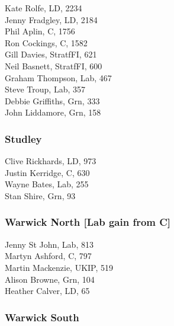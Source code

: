 \documentclass[a4paper,openany,10pt]{book}
\begin{document}


Kate Rolfe, LD, 2234\\
Jenny Fradgley, LD, 2184\\
Phil Aplin, C, 1756\\
Ron Cockings, C, 1582\\
Gill Davies, StratfFI, 621\\
Neil Basnett, StratfFI, 600\\
Graham Thompson, Lab, 467\\
Steve Troup, Lab, 357\\
Debbie Griffiths, Grn, 333\\
John Liddamore, Grn, 158\\


\subsubsection*{Studley}



Clive Rickhards, LD, 973\\
Justin Kerridge, C, 630\\
Wayne Bates, Lab, 255\\
Stan Shire, Grn, 93\\


\subsubsection*{Warwick North \hspace*{\fill}\nolinebreak[1]%
\enspace\hspace*{\fill}
[Lab gain from C]}



Jenny St John, Lab, 813\\
Martyn Ashford, C, 797\\
Martin Mackenzie, UKIP, 519\\
Alison Browne, Grn, 104\\
Heather Calver, LD, 65\\


\subsubsection*{Warwick South}

\end{document}
